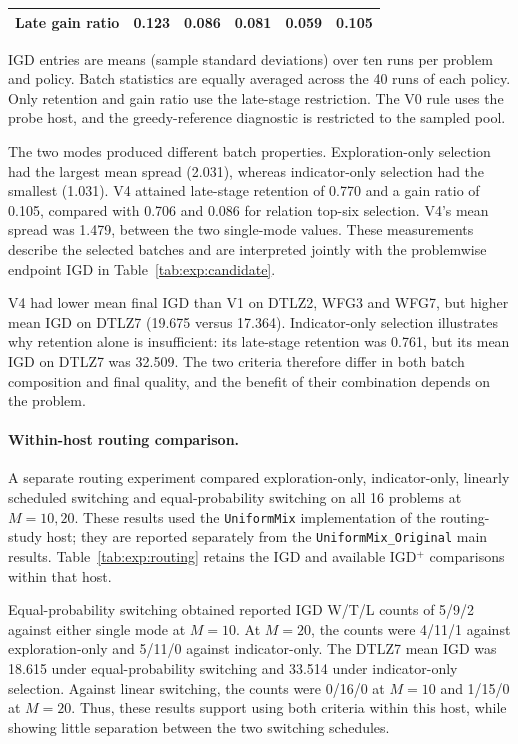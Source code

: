 \documentclass[final,5p,times,twocolumn]{elsarticle}
\begin{document}
\begin{table}[t]
\begin{tabular}{lccccc}
Late gain ratio & 0.123 & 0.086 & 0.081 & 0.059 & 0.105 \\
\bottomrule
\end{tabular}
\par\smallskip
\begin{minipage}{\linewidth}
\scriptsize IGD entries are means (sample standard deviations) over ten runs per problem and policy. Batch statistics are equally averaged across the 40 runs of each policy. Only retention and gain ratio use the late-stage restriction. The V0 rule uses the probe host, and the greedy-reference diagnostic is restricted to the sampled pool.
\end{minipage}
\end{table}

The two modes produced different batch properties. Exploration-only
selection had the largest mean spread (2.031), whereas indicator-only
selection had the smallest (1.031). V4 attained late-stage retention
of 0.770 and a gain ratio of 0.105, compared with 0.706 and 0.086 for
relation top-six selection. V4's mean spread was 1.479, between the two
single-mode values. These measurements describe the selected batches
and are interpreted jointly with the problemwise endpoint IGD in
Table~\ref{tab:exp:candidate}.

V4 had lower mean final IGD than V1 on DTLZ2, WFG3 and WFG7, but higher
mean IGD on DTLZ7 (19.675 versus 17.364). Indicator-only selection
illustrates why retention alone is insufficient: its late-stage
retention was 0.761, but its mean IGD on DTLZ7 was 32.509. The two
criteria therefore differ in both batch composition and final quality,
and the benefit of their combination depends on the problem.

\paragraph{Within-host routing comparison.}
A separate routing experiment compared exploration-only,
indicator-only, linearly scheduled switching and equal-probability
switching on all 16 problems at $M=10,20$. These results used the
\texttt{UniformMix} implementation of the routing-study host; they are
reported separately from the \texttt{UniformMix\_Original} main results.
Table~\ref{tab:exp:routing} retains the IGD and available IGD$^+$
comparisons within that host.

Equal-probability switching obtained reported IGD W/T/L counts of
5/9/2 against either single mode at $M=10$. At $M=20$, the counts were
4/11/1 against exploration-only and 5/11/0 against indicator-only.
The DTLZ7 mean IGD was 18.615 under equal-probability switching and
33.514 under indicator-only selection. Against linear switching, the
counts were 0/16/0 at $M=10$ and 1/15/0 at $M=20$. Thus, these results
support using both criteria within this host, while showing little
separation between the two switching schedules.
\end{document}
